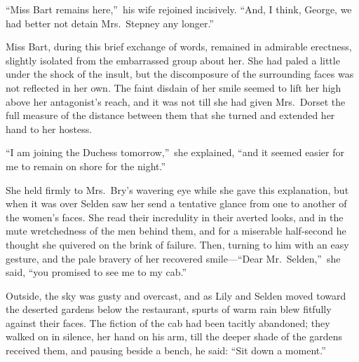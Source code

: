 \documentclass[12pt,a4paper]{book}
\begin{document}
``Miss Bart remains here,''\ his wife rejoined incisively. ``And, I
think, George, we had better not detain Mrs.\ Stepney any longer.''





Miss Bart, during this brief exchange of words, remained in
admirable erectness, slightly isolated from the embarrassed group
about her. She had paled a little under the shock of the insult,
but the discomposure of the surrounding faces was not reflected
in her own. The faint disdain of her smile seemed to lift
her high above her antagonist's reach, and it was not till she
had given Mrs.\ Dorset the full measure of the distance between
them that she turned and extended her hand to her hostess.





``I am joining the Duchess tomorrow,''\ she explained, ``and it
seemed easier for me to remain on shore for the night.''





She held firmly to Mrs.\ Bry's wavering eye while she gave this
explanation, but when it was over Selden saw her send a tentative
glance from one to another of the women's faces. She read their
incredulity in their averted looks, and in the mute wretchedness
of the men behind them, and for a miserable half-second he
thought she quivered on the brink of failure. Then, turning to
him with an easy gesture, and the pale bravery of her recovered
smile---``Dear Mr.\ Selden,''\ she said, ``you promised to see me to my
cab.''







Outside, the sky was gusty and overcast, and as Lily and Selden
moved toward the deserted gardens below the restaurant, spurts of
warm rain blew fitfully against their faces. The fiction of the
cab had been tacitly abandoned; they walked on in silence, her
hand on his arm, till the deeper shade of the gardens received
them, and pausing beside a bench, he said: ``Sit down a moment.''
\end{document}
